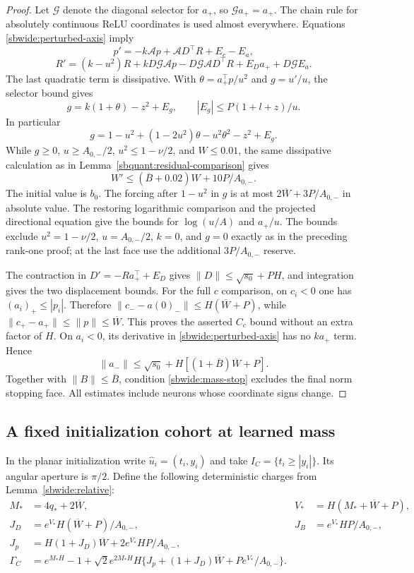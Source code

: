 \documentclass[11pt]{article}
\theoremstyle{remark}
\begin{document}
\begin{proof}
Let $\mathcal G$ denote the diagonal selector for $a_+$, so
$\mathcal G a_+=a_+$. The chain rule for absolutely continuous ReLU
coordinates is used almost everywhere. Equations
\eqref{sbwide:perturbed-axis} imply
\[
 p'=-k\mathcal A p+\mathcal A D^\top R+E_c-E_a,
\]
\[
 R'=(k-u^2)R+kD\mathcal G\mathcal A p
 -D\mathcal G\mathcal A D^\top R+E_Da_++D\mathcal G E_a.
\]
The last quadratic term is dissipative. With
$\theta=a_+^\top p/u^2$ and $g=u'/u$, the selector bound gives
\[
 g=k(1+\theta)-z^2+E_g,
 \qquad |E_g|\le P(1+l+z)/u.
\]
In particular
\[
 g=1-u^2+(1-2u^2)\theta-u^2\theta^2-z^2+E_g.
\]
While $g\ge0$, $u\ge A_{0,-}/2$, $u^2\le1-\nu/2$, and
$W\le0.01$, the same dissipative calculation as in
Lemma~\ref{sbquant:residual-comparison} gives
\[
 W'\le(\overline B+0.02)W+10P/A_{0,-}.
\]
The initial value is $b_0$. The forcing after $1-u^2$ in $g$ is at most
$2\overline W+3P/A_{0,-}$ in absolute value. The restoring logarithmic
comparison and the projected directional equation give the bounds for
$\log(u/A)$ and $a_+/u$.
The bounds exclude $u^2=1-\nu/2$, $u=A_{0,-}/2$, $k=0$, and $g=0$
exactly as in the preceding rank-one proof; at the last face use the
additional $3P/A_{0,-}$ reserve.

The contraction in $D'=-Ra_+^\top+E_D$ gives
$\|D\|\le\sqrt{s_0}+PH$, and integration gives the two displacement
bounds. For the full $c$ comparison, on $c_i<0$ one has
$(a_i)_+\le|p_i|$. Therefore
$\|c_- -a(0)_-\|\le H(\overline W+P)$, while
$\|c_+-a_+\|\le\|p\|\le\overline W$.
This proves the asserted $C_c$ bound without an extra factor of $H$.
On $a_i<0$, its derivative in \eqref{sbwide:perturbed-axis} has no
$ka_+$ term. Hence
\[
 \|a_-\|\le\sqrt{s_0}+H[(1+\overline B)\overline W+P].
\]
Together with $\|B\|\le\overline B$, condition
\eqref{sbwide:mass-stop} excludes the final norm stopping face.
All estimates include neurons whose coordinate signs change.
\end{proof}

\subsection{A fixed initialization cohort at learned mass}

In the planar initialization write $\widehat u_i=(t_i,y_i)$ and take
$I_C=\{t_i\ge|y_i|\}$. Its angular aperture is $\pi/2$.
Define the following deterministic charges from Lemma~\ref{sbwide:relative}:
\begin{align*}
 M_*&=4q_*+2\overline W,& V_*&=H(M_*+\overline W+P),\\
 J_D&=e^{V_*}H(\overline W+P)/A_{0,-},&
 J_B&=e^{V_*}HP/A_{0,-},\\
 J_p&=H(1+J_D)\overline W+2e^{V_*}HP/A_{0,-},\\
 \Gamma_C&=e^{M_*H}-1+
 \sqrt2e^{2M_*H}H\{J_p+(1+J_D)\overline W+Pe^{V_*}/A_{0,-}\}.
\end{align*}
\end{document}
